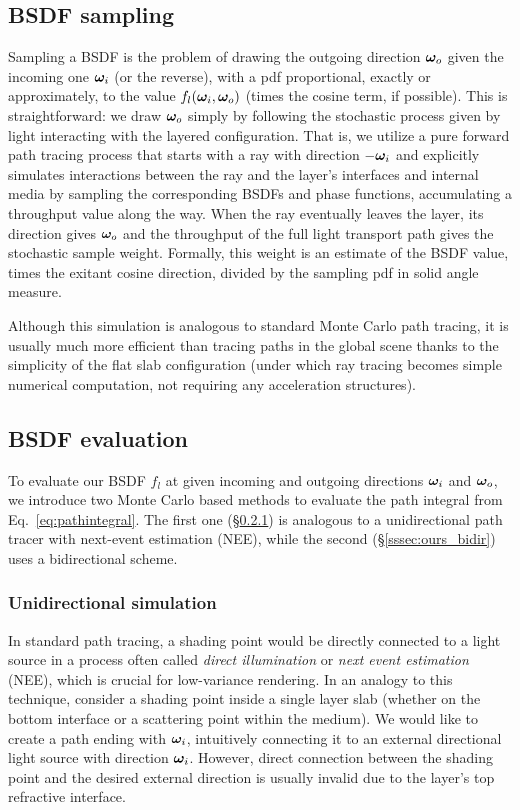 \subsection{BSDF sampling}
\label{subsec:ours_sample}
%
Sampling a BSDF is the problem of drawing the outgoing direction $\bm{\omega}_o$ given the incoming one $\bm{\omega}_i$ (or the reverse), with a pdf proportional, exactly or approximately, to the value $f_l(\bm{\omega}_i, \bm{\omega}_o)$ (times the cosine term, if possible).
This is straightforward: we draw $\bm{\omega}_o$ simply by following the stochastic process given by light interacting with the layered configuration.
That is, we utilize a pure forward path tracing process that starts with a ray with direction $-\bm{\omega}_i$ and explicitly simulates interactions between the ray and the layer's interfaces and internal media by sampling the corresponding BSDFs and phase functions, accumulating a throughput value along the way.
When the ray eventually leaves the layer, its direction gives $\bm{\omega}_o$ and the throughput of the full light transport path gives the stochastic sample weight. Formally, this weight is an estimate of the BSDF value, times the exitant cosine direction, divided by the sampling pdf in solid angle measure.

Although this simulation is analogous to standard Monte Carlo path tracing, it is usually much more efficient than tracing paths in the global scene thanks to the simplicity of the flat slab configuration (under which ray tracing becomes simple numerical computation, not requiring any acceleration structures).

\subsection{BSDF evaluation}
\label{subsec:ours_eval}
%
To evaluate our BSDF $f_l$ at given incoming and outgoing directions $\bm{\omega}_i$ and $\bm{\omega}_o$, we introduce two Monte Carlo based methods to evaluate the path integral from Eq.~\eqref{eq:pathintegral}.
The first one (\S\ref{sssec:ours_unidir}) is analogous to a unidirectional path tracer with next-event estimation (NEE), while the second (\S\ref{sssec:ours_bidir}) uses a bidirectional scheme.

\subsubsection{Unidirectional simulation}
\label{sssec:ours_unidir}
%
In standard path tracing, a shading point would be directly connected to a light source in a process often called \emph{direct illumination} or \emph{next event estimation} (NEE), which is crucial for low-variance rendering. In an analogy to this technique, consider a shading point inside a single layer slab (whether on the bottom interface or a scattering point within the medium). We would like to create a path ending with $\bm{\omega}_i$, intuitively connecting it to an external directional light source with direction $\bm{\omega}_i$. However, direct connection between the shading point and the desired external direction is usually invalid due to the layer's top refractive interface.

